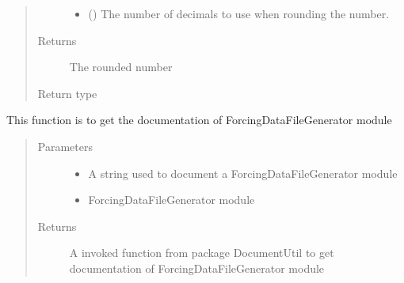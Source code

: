 \documentclass[letterpaper,10pt,english]{sphinxmanual}
\begin{document}
\begin{fulllineitems}
\begin{fulllineitems}
\begin{quote}
\begin{description}
\begin{itemize}
\item {} 
 () \textendash{} The number of decimals to use when rounding the number.

\end{itemize}

\item[{Returns}] \leavevmode
The rounded number

\item[{Return type}] \leavevmode
{}

\end{description}\end{quote}

\end{fulllineitems}


\begin{fulllineitems}
\label{\detokenize{AgentTools.GenericModelAgent:AgentTools.GenericModelAgent.ForcingDataFileGenerator.ForcingDataFileGenerator.get_documentation}}
This function is to get the documentation of ForcingDataFileGenerator module
\begin{quote}\begin{description}
\item[{Parameters}] \leavevmode\begin{itemize}
\item {} 
 \textendash{} A string used to document a ForcingDataFileGenerator module

\item {} 
 \textendash{} ForcingDataFileGenerator module

\end{itemize}

\item[{Returns}] \leavevmode
A invoked function from package DocumentUtil to get documentation of ForcingDataFileGenerator module


\end{description}
\end{quote}
\end{fulllineitems}
\end{fulllineitems}
\end{document}
